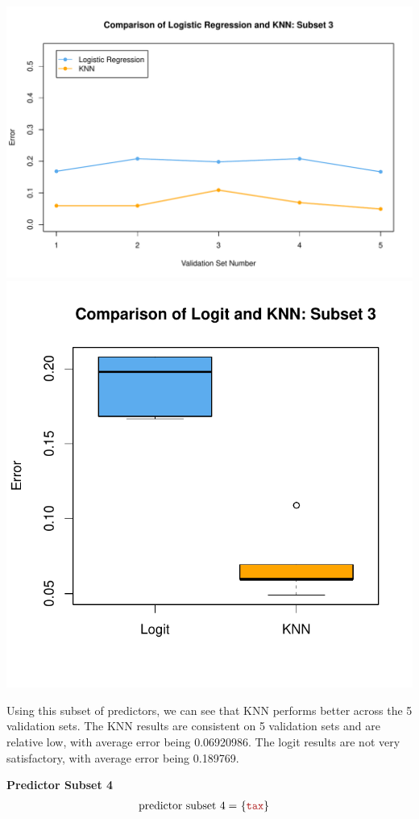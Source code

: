 \documentclass{article}
\begin{document}
\begin{center}
    \includegraphics[width=0.8\linewidth]{Images/Prob5/Prob5-13-Plot-Subset3.pdf}
    \includegraphics[width=0.45\linewidth]{Images/Prob5/Prob5-13-Boxplot-Subset3.pdf}
\end{center}

Using this subset of predictors, we can see that KNN performs better across the 5 validation sets. 
The KNN results are consistent on 5 validation sets and are relative low, with average error being 0.06920986.
The logit results are not very satisfactory, with average error being 0.189769.
\bigskip



\noindent\textbf{Predictor Subset 4}
\[
    \begin{aligned}
    \text{predictor subset 4} =&\ 
    \{ 
        \feat{tax}
    \}
    \end{aligned}
\]
\end{document}
